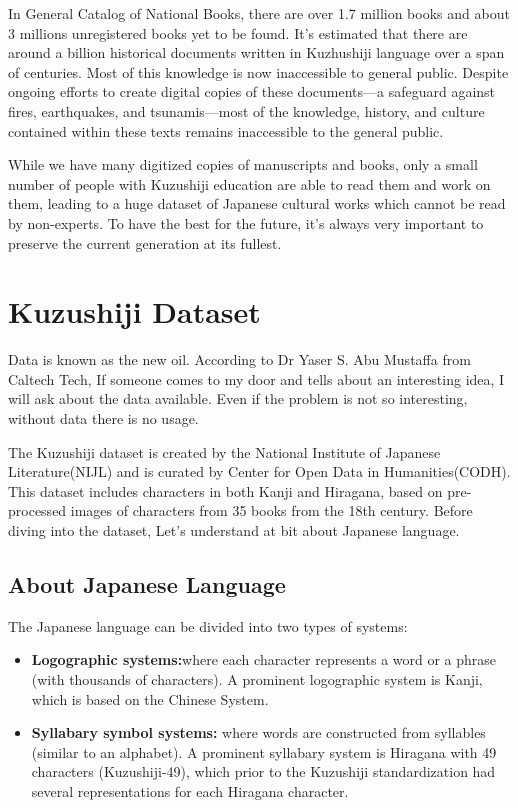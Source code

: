 \documentclass[12pt]{report}
\begin{document}
In General Catalog of National Books, there are over 1.7 million books
and about 3 millions unregistered books yet to be found. It's
estimated that there are around a billion historical documents written
in Kuzhushiji language over a span of centuries. Most of this
knowledge is now inaccessible to general public. Despite ongoing
efforts to create digital copies of these documents—a safeguard
against fires, earthquakes, and tsunamis—most of the knowledge,
history, and culture contained within these texts remains inaccessible
to the general public.

While we have many digitized copies of manuscripts and books, only a
small number of people with Kuzushiji education are able to read them
and work on them, leading to a huge dataset of Japanese cultural works
which cannot be read by non-experts. To have the best for the future,
it’s always very important to preserve the current generation at its
fullest.


\chapter{Kuzushiji Dataset}
Data is known as the new oil. According to Dr Yaser S. Abu  Mustaffa
from Caltech Tech,
If someone comes to my door and tells about an interesting idea, I
will ask about the
data available. Even if the problem is not so interesting, without
data there is no
usage.

The Kuzushiji dataset is created by the National Institute of Japanese
Literature(NIJL)
and is curated by Center for Open Data in Humanities(CODH). This
dataset includes
characters in both Kanji and Hiragana, based on pre-processed images
of characters from
35 books from the 18th century. Before diving into the dataset, Let’s
understand at bit
about Japanese language.

\section{About Japanese Language}


The Japanese language can be divided into two types of systems:


\begin{itemize}
  \item \textbf{Logographic systems:}where each character represents a
word or a phrase (with thousands of characters). A prominent
logographic system is Kanji, which is based on the Chinese System.
  \item \textbf{Syllabary symbol systems:} where words are constructed
from syllables (similar to an alphabet). A prominent syllabary system
is Hiragana with 49 characters (Kuzushiji-49), which prior to the
Kuzushiji standardization had several representations for each
Hiragana character.
\end{itemize}
\end{document}
